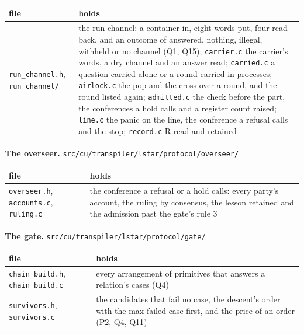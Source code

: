 {\small
\setlength{\tabcolsep}{6pt}
\begin{longtable}{>{\RaggedRight\arraybackslash}p{}>{\RaggedRight\arraybackslash}p{}}
\toprule
file & holds \\
\midrule
\endhead
\texttt{run\_\allowbreak{}channel.\allowbreak{}h}, \texttt{run\_\allowbreak{}channel/\allowbreak{}} & the run channel: a container in, eight words put, four read back, and an outcome of answered, nothing, illegal, withheld or no channel (Q1, Q15); \texttt{carrier.\allowbreak{}c} the carrier's words, a dry channel and an answer read; \texttt{carried.\allowbreak{}c} a question carried alone or a round carried in processes; \texttt{airlock.\allowbreak{}c} the pop and the cross over a round, and the round listed again; \texttt{admitted.\allowbreak{}c} the check before the part, the conferences a hold calls and a register count raised; \texttt{line.\allowbreak{}c} the panic on the line, the conference a refusal calls and the stop; \texttt{record.\allowbreak{}c} R read and retained \\
\bottomrule
\end{longtable}
}

\textbf{The overseer.} \texttt{src/\allowbreak{}cu/\allowbreak{}transpiler/\allowbreak{}lstar/\allowbreak{}protocol/\allowbreak{}overseer/\allowbreak{}}

{\small
\setlength{\tabcolsep}{6pt}
\begin{longtable}{>{\RaggedRight\arraybackslash}p{}>{\RaggedRight\arraybackslash}p{}}
\toprule
file & holds \\
\midrule
\endhead
\texttt{overseer.\allowbreak{}h}, \texttt{accounts.\allowbreak{}c}, \texttt{ruling.\allowbreak{}c} & the conference a refusal or a hold calls: every party's account, the ruling by consensus, the lesson retained and the admission past the gate's rule 3 \\
\bottomrule
\end{longtable}
}

\textbf{The gate.} \texttt{src/\allowbreak{}cu/\allowbreak{}transpiler/\allowbreak{}lstar/\allowbreak{}protocol/\allowbreak{}gate/\allowbreak{}}

{\small
\setlength{\tabcolsep}{6pt}
\begin{longtable}{>{\RaggedRight\arraybackslash}p{}>{\RaggedRight\arraybackslash}p{}}
\toprule
file & holds \\
\midrule
\endhead
\texttt{chain\_\allowbreak{}build.\allowbreak{}h}, \texttt{chain\_\allowbreak{}build.\allowbreak{}c} & every arrangement of primitives that answers a relation's cases (Q4) \\
\texttt{survivors.\allowbreak{}h}, \texttt{survivors.\allowbreak{}c} & the candidates that fail no case, the descent's order with the max-failed case first, and the price of an order (P2, Q4, Q11) \\
\bottomrule
\end{longtable}
}

